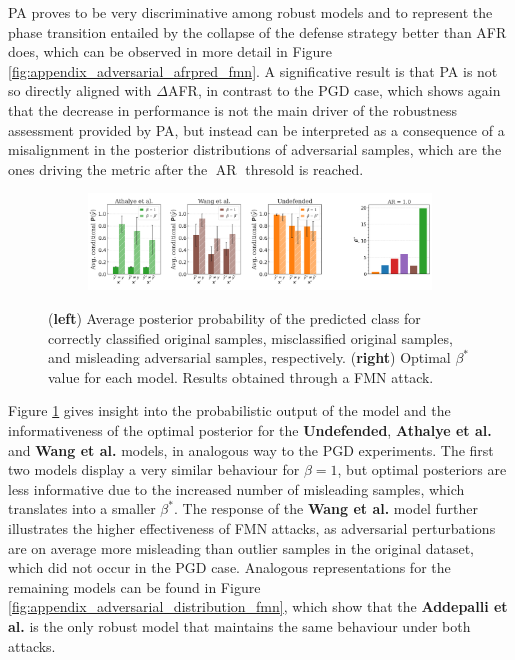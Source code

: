 PA proves to be very discriminative among robust models and to represent the 
phase transition entailed by the collapse of the defense strategy better than AFR does, which can be
observed in more detail in Figure \ref{fig:appendix_adversarial_afrpred_fmn}. A significative
result is that PA is not so directly aligned with $\Delta$AFR, in contrast to
the PGD case, which shows again that the decrease in performance is not the main driver of
the robustness assessment provided by PA, but instead can be interpreted as a consequence of
a misalignment in the posterior distributions of adversarial samples, which are the ones driving
the metric after the $\operatorname{AR}$ thresold is reached. \\

\begin{figure}[H]
    \centering
    \begin{subfigure}[b]{\textwidth}
        \centering
        \includegraphics[width=\textwidth]{img/results_discussion/adversarial/bpda_wang_undefended_beta_fmn.png}
    \end{subfigure}
   
    \caption{(\textbf{left}) Average posterior probability of the predicted class for 
    correctly classified original samples, misclassified original samples, and 
    misleading adversarial samples, respectively. (\textbf{right}) Optimal $\beta^{*}$ value for each model.
    Results obtained through a FMN attack.}
    \label{fig:unrobust_posterior_short_fmn}
\end{figure}

Figure \ref{fig:unrobust_posterior_short_fmn} gives insight into the probabilistic output
of the model and the informativeness of the optimal posterior for the {\color{tab:orange} \textbf{Undefended}}, 
{\color{tab:green} \textbf{Athalye et al.}} and {\color{tab:brown} \textbf{Wang et al.}} models, in
analogous way to the PGD experiments. The first two models display a very similar behaviour for 
$\beta = 1$, but optimal posteriors are less informative due to the increased number of misleading
samples, which translates into a smaller $\beta^{*}$. The response of 
the {\color{tab:brown} \textbf{Wang et al.}} model further illustrates the higher effectiveness of
FMN attacks, as adversarial perturbations are on average more misleading than outlier samples in
the original dataset, which did not occur in the PGD case. Analogous representations for the remaining
models can be found in Figure \ref{fig:appendix_adversarial_distribution_fmn}, which show
that the {\color{tab:purple} \textbf{Addepalli et al.}} is the only robust model that maintains
the same behaviour under both attacks.\\

